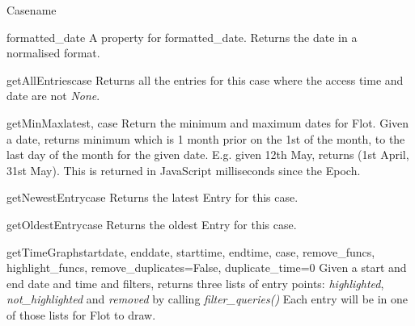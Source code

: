\documentclass[letterpaper,10pt,english]{manual}
\begin{document}
\begin{classdesc}{Case}{name}
\hypertarget{webscavator.model.models.Case.formatted_date}{}\begin{memberdesc}{formatted\_date}
A property for formatted\_date. Returns the date in a normalised format.
\end{memberdesc}

\hypertarget{webscavator.model.models.Case.getAllEntries}{}\begin{staticmethoddesc}{getAllEntries}{case}
Returns all the entries for this case where the access time and date are not \emph{None}.
\end{staticmethoddesc}

\hypertarget{webscavator.model.models.Case.getMinMax}{}\begin{staticmethoddesc}{getMinMax}{latest, case}
Return the minimum and maximum dates for Flot. Given a date, returns minimum which is
1 month prior on the 1st of the month, to the last day of the month for the given date.
E.g. given 12th May, returns (1st April, 31st May). This is returned in JavaScript 
milliseconds since the Epoch.
\end{staticmethoddesc}

\hypertarget{webscavator.model.models.Case.getNewestEntry}{}\begin{staticmethoddesc}{getNewestEntry}{case}
Returns the latest Entry for this case.
\end{staticmethoddesc}

\hypertarget{webscavator.model.models.Case.getOldestEntry}{}\begin{staticmethoddesc}{getOldestEntry}{case}
Returns the oldest Entry for this case.
\end{staticmethoddesc}

\hypertarget{webscavator.model.models.Case.getTimeGraph}{}\begin{staticmethoddesc}{getTimeGraph}{startdate, enddate, starttime, endtime, case, remove\_funcs, highlight\_funcs, remove\_duplicates=False, duplicate\_time=0}
Given a start and end date and time and filters, returns three lists of entry points:
\emph{highlighted}, \emph{not\_highlighted} and \emph{removed} by calling \emph{filter\_queries()}
Each entry will be in one of those lists for Flot to draw.
\end{staticmethoddesc}


\end{classdesc}
\end{document}

